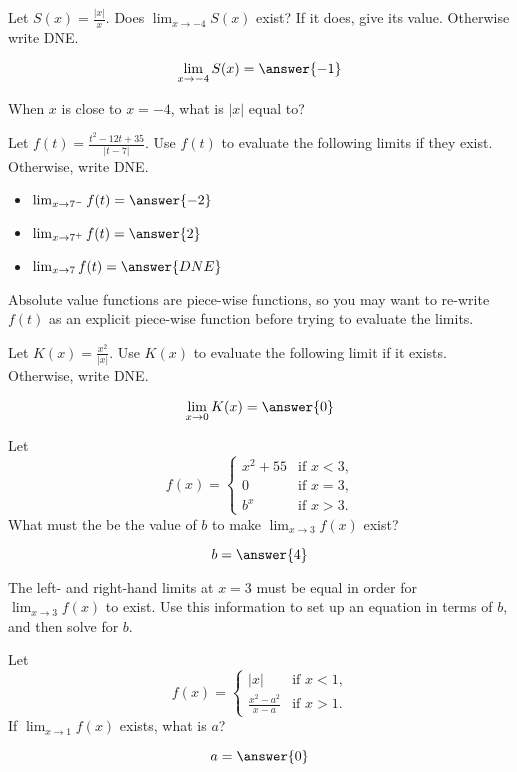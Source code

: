 \documentclass[handout]{ximera}
\begin{document}
\begin{exercise}
Let $S(x) = \frac{|x|}{x}$.  Does $\displaystyle\lim_{x \to -4} S(x)$ exist?  If it
does, give its value.  Otherwise write DNE.

\[
\lim_{x \to -4} S(x) = \answer{-1}
\] 

\begin{hint}
When $x$ is close to $x=-4$, what is $|x|$ equal to? 
\end{hint}

\end{exercise}

\begin{exercise}
Let $f(t) = \frac{t^2 - 12t +35}{|t-7|}$.  Use $f(t)$ to evaluate the following limits if they exist.  Otherwise, write DNE.

\begin{itemize}

\item [] $\lim_{x \to 7^-} f(t) = \answer{-2}$

\item [] $\lim_{x \to 7^+} f(t) = \answer{2}$

\item [] $\lim_{x \to 7} f(t) = \answer{DNE}$

\end{itemize}

\begin{hint}
Absolute value functions are piece-wise functions, so you may want to re-write $f(t)$ as an explicit piece-wise function before trying to evaluate the limits. 
\end{hint}

\end{exercise}

\begin{exercise}
Let $K(x) = \frac{x^2}{|x|}$.  Use $K(x)$ to evaluate the following limit if it exists.  Otherwise, write DNE.

\[
\lim_{x \to 0} K(x) = \answer{0}
\]

\end{exercise}

\begin{exercise}
Let
\[
f(x) =
\begin{cases} x^2+55 &\text{if $x<3$,}\\
  0 &\text{if $x=3$,} \\
  b^x &\text{if $x>3$.}
\end{cases}
\]  
What must the be the value of $b$ to make $\displaystyle\lim_{x \to 3} f(x)$ exist?

\[
b = \answer{4}
\]

\begin{hint}
  The left- and right-hand limits at $x=3$ must be equal in order for $\displaystyle\lim_{x \to 3} f(x)$ to exist.  Use this information to
  set up an equation in terms of $b$, and then solve for $b$.
\end{hint}
\end{exercise}

\begin{exercise}
Let
\[
f(x) = \begin{cases}
  |x| &\text{if $x<1$,} \\
  \frac{x^2-a^2}{x-a} &\text{if $x>1$.}
\end{cases}
\]
If $\displaystyle\lim_{x \to 1} f(x)$ exists, what is $a$?

  \[
a = \answer{0}
\]

\end{exercise}
\end{document}
